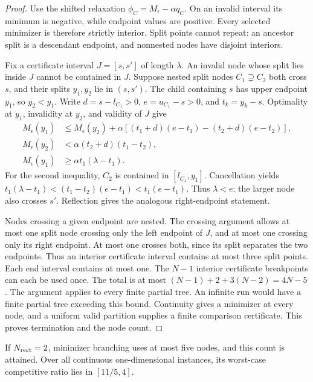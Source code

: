 \begin{proof}
Use the shifted relaxation
$\phi_C=M_\epsilon-\alpha q_C$. On an invalid interval its minimum is
negative, while endpoint values are positive. Every selected minimizer
is therefore strictly interior. Split points cannot repeat: an ancestor
split is a descendant endpoint, and nonnested nodes have disjoint interiors.

Fix a certificate interval $J=[s,s']$ of length $\lambda$. An invalid
node whose split lies inside $J$ cannot be contained in $J$.
Suppose nested split nodes $C_1\supsetneq C_2$ both cross $s$, and their
splits $y_1,y_2$ lie in $(s,s')$. The child containing $s$ has upper
endpoint $y_1$, so $y_2<y_1$. Write
$d=s-l_{C_1}>0$, $e=u_{C_1}-s>0$, and $t_k=y_k-s$.
Optimality at $y_1$, invalidity at $y_2$, and validity of $J$ give
\begin{align*}
 M_\epsilon(y_1)&\le M_\epsilon(y_2)
 +\alpha[(t_1+d)(e-t_1)-(t_2+d)(e-t_2)],\\
 M_\epsilon(y_2)&<\alpha(t_2+d)(t_1-t_2),\\
 M_\epsilon(y_1)&\ge\alpha t_1(\lambda-t_1).
\end{align*}
For the second inequality, $C_2$ is contained in $[l_{C_1},y_1]$.
Cancellation yields
$t_1(\lambda-t_1)<(t_1-t_2)(e-t_1)<t_1(e-t_1)$.
Thus $\lambda<e$: the larger node also crosses $s'$.
Reflection gives the analogous right-endpoint statement.

Nodes crossing a given endpoint are nested. The crossing argument allows
at most one split node crossing only the left endpoint of $J$, and at most
one crossing only its right endpoint. At most one crosses both, since its
split separates the two endpoints. Thus an interior certificate interval
contains at most three split points. Each end interval contains at most
one. The $N-1$ interior certificate breakpoints can each be used once.
The total is at most $(N-1)+2+3(N-2)=4N-5$.
The argument applies to every finite partial tree. An infinite run would
have a finite partial tree exceeding this bound. Continuity gives a
minimizer at every node, and a uniform valid partition supplies a finite
comparison certificate. This proves termination and the node count.
\end{proof}

\begin{proposition}
\label{branching:ratio-range}
If $N_{\rm rect}=2$, minimizer branching uses at most five nodes, and
this count is attained. Over all continuous one-dimensional instances,
its worst-case competitive ratio lies in $[11/5,4]$.
\end{proposition}

